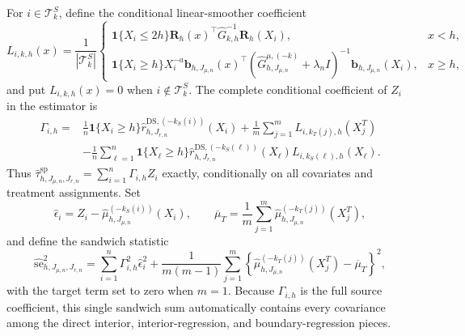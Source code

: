 For \(i\in\mathcal T^S_k\), define the conditional linear-smoother coefficient
\[
L_{i,k,h}(x)=\frac1{|\mathcal T^S_k|}
\begin{cases}
\mathbf 1\{X_i\le2h\}\mathbf R_h(x)^\top\widehat G_{k,h}^{-1}\mathbf R_h(X_i),&x<h,\\
\mathbf 1\{X_i\ge h\}X_i^{-a}\mathbf b_{h,J_{\mu,n}}(x)^\top
\left(\widehat G^{\mu,(-k)}_{h,J_{\mu,n}}+\lambda_nI\right)^{-1}\mathbf b_{h,J_{\mu,n}}(X_i),&x\ge h,
\end{cases}
\]
and put \(L_{i,k,h}(x)=0\) when \(i\notin\mathcal T^S_k\).  The complete conditional coefficient of \(Z_i\) in the estimator is
\[
\begin{aligned}
\Gamma_{i,h}={}&\frac1n\mathbf 1\{X_i\ge h\}\widehat r^{\mathrm{DS},(-k_S(i))}_{h,J_{r,n}}(X_i)
+\frac1m\sum_{j=1}^mL_{i,k_T(j),h}(X_j^T)\\
&-\frac1n\sum_{\ell=1}^n\mathbf 1\{X_\ell\ge h\}\widehat r^{\mathrm{DS},(-k_S(\ell))}_{h,J_{r,n}}(X_\ell)L_{i,k_S(\ell),h}(X_\ell).
\end{aligned}
\]
Thus \(\widehat\tau^{\mathrm{sp}}_{h,J_{\mu,n},J_{r,n}}=\sum_{i=1}^n\Gamma_{i,h}Z_i\) exactly, conditionally on all covariates and treatment assignments.  Set
\[
\widehat\epsilon_i=Z_i-\widehat\mu^{(-k_S(i))}_{h,J_{\mu,n}}(X_i),
\qquad
\overline\mu_T=\frac1m\sum_{j=1}^m\widehat\mu^{(-k_T(j))}_{h,J_{\mu,n}}(X_j^T),
\]
and define the sandwich statistic
\[
\widehat{\mathrm{se}}_{h,J_{\mu,n},J_{r,n}}^2
=\sum_{i=1}^n\Gamma_{i,h}^2\widehat\epsilon_i^2
+\frac1{m(m-1)}\sum_{j=1}^m
\left\{\widehat\mu^{(-k_T(j))}_{h,J_{\mu,n}}(X_j^T)-\overline\mu_T\right\}^2,
\]
with the target term set to zero when \(m=1\).  Because \(\Gamma_{i,h}\) is the full source coefficient, this single sandwich sum automatically contains every covariance among the direct interior, interior-regression, and boundary-regression pieces.